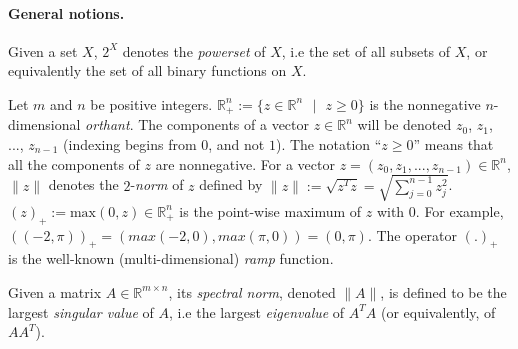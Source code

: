 \documentclass{article} %
\begin{document}
\paragraph{\textbf{General notions.}}
Given a set $X$, $2^X$ denotes the \emph{powerset} of $X$, i.e the set
of all subsets of $X$, or equivalently the set of all binary
functions on $X$.

Let $m$ and $n$ be positive integers.
$\mathbb{R}^{n}_+ := \{z \in \mathbb{R}^{n}\text{ }|\text{ } z \geq
0\}$ is the nonnegative $n$-dimensional \textit{orthant}.  The
components of a vector $z \in \mathbb{R}^n$ will be denoted $z_0$,
$z_1$, ..., $z_{n-1}$ (indexing begins from $0$, and not $1$). The
notation ``$z \ge 0$'' means that all the components of $z$ are
nonnegative. For a vector $z = (z_0, z_1, ..., z_{n-1}) \in
\mathbb{R}^n$, $\|z\|$ denotes the $2$-\textit{norm} of $z$ defined
by $\|z\| := \sqrt{z^Tz} = \sqrt{\sum_{j=0}^{n - 1}{z_j^2}}$.
$(z)_+:=\text{max}(0, z) \in \mathbb{R}^{n}_+$ is the point-wise
maximum of $z$ with $0$. For example, $((-2, \pi))_+ = (max(-2, 0),
max(\pi, 0)) = (0, \pi)$.
The operator $(.)_+$ is the well-known
(multi-dimensional) \textit{ramp} function.

Given a matrix $A \in \mathbb{R}^{m \times n}$, its \textit{spectral
  norm}, denoted $\|A\|$, is
 defined to be the largest \textit{singular value} of $A$, i.e the
 largest \textit{eigenvalue} of $A^TA$ (or equivalently, of $AA^T$).
\end{document}
